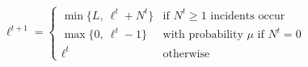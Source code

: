 
\color{ink}$\displaystyle
\ell^{t+1}=\begin{cases}\min\{L,\ \ell^t+N^t\} & \text{if } N^t\ge1 \text{ incidents occur}\\ \max\{0,\ \ell^t-1\} & \text{with probability } \mu \text{ if } N^t=0\\ \ell^t & \text{otherwise}\end{cases}
$
